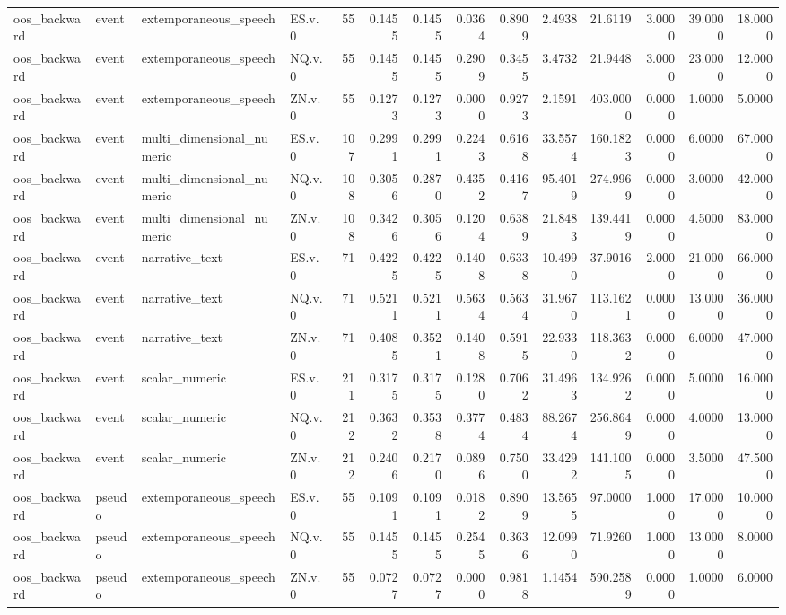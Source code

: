 \begin{tabular}{llllrrrrrrrrrr}
oos_backward & event & extemporaneous_speech & ES.v.0 & 55 & 0.1455 & 0.1455 & 0.0364 & 0.8909 & 2.4938 & 21.6119 & 3.0000 & 39.0000 & 18.0000 \\
oos_backward & event & extemporaneous_speech & NQ.v.0 & 55 & 0.1455 & 0.1455 & 0.2909 & 0.3455 & 3.4732 & 21.9448 & 3.0000 & 23.0000 & 12.0000 \\
oos_backward & event & extemporaneous_speech & ZN.v.0 & 55 & 0.1273 & 0.1273 & 0.0000 & 0.9273 & 2.1591 & 403.0000 & 0.0000 & 1.0000 & 5.0000 \\
oos_backward & event & multi_dimensional_numeric & ES.v.0 & 107 & 0.2991 & 0.2991 & 0.2243 & 0.6168 & 33.5574 & 160.1823 & 0.0000 & 6.0000 & 67.0000 \\
oos_backward & event & multi_dimensional_numeric & NQ.v.0 & 108 & 0.3056 & 0.2870 & 0.4352 & 0.4167 & 95.4019 & 274.9969 & 0.0000 & 3.0000 & 42.0000 \\
oos_backward & event & multi_dimensional_numeric & ZN.v.0 & 108 & 0.3426 & 0.3056 & 0.1204 & 0.6389 & 21.8483 & 139.4419 & 0.0000 & 4.5000 & 83.0000 \\
oos_backward & event & narrative_text & ES.v.0 & 71 & 0.4225 & 0.4225 & 0.1408 & 0.6338 & 10.4990 & 37.9016 & 2.0000 & 21.0000 & 66.0000 \\
oos_backward & event & narrative_text & NQ.v.0 & 71 & 0.5211 & 0.5211 & 0.5634 & 0.5634 & 31.9670 & 113.1621 & 0.0000 & 13.0000 & 36.0000 \\
oos_backward & event & narrative_text & ZN.v.0 & 71 & 0.4085 & 0.3521 & 0.1408 & 0.5915 & 22.9330 & 118.3632 & 0.0000 & 6.0000 & 47.0000 \\
oos_backward & event & scalar_numeric & ES.v.0 & 211 & 0.3175 & 0.3175 & 0.1280 & 0.7062 & 31.4963 & 134.9262 & 0.0000 & 5.0000 & 16.0000 \\
oos_backward & event & scalar_numeric & NQ.v.0 & 212 & 0.3632 & 0.3538 & 0.3774 & 0.4834 & 88.2674 & 256.8649 & 0.0000 & 4.0000 & 13.0000 \\
oos_backward & event & scalar_numeric & ZN.v.0 & 212 & 0.2406 & 0.2170 & 0.0896 & 0.7500 & 33.4292 & 141.1005 & 0.0000 & 3.5000 & 47.5000 \\
oos_backward & pseudo & extemporaneous_speech & ES.v.0 & 55 & 0.1091 & 0.1091 & 0.0182 & 0.8909 & 13.5655 & 97.0000 & 1.0000 & 17.0000 & 10.0000 \\
oos_backward & pseudo & extemporaneous_speech & NQ.v.0 & 55 & 0.1455 & 0.1455 & 0.2545 & 0.3636 & 12.0990 & 71.9260 & 1.0000 & 13.0000 & 8.0000 \\
oos_backward & pseudo & extemporaneous_speech & ZN.v.0 & 55 & 0.0727 & 0.0727 & 0.0000 & 0.9818 & 1.1454 & 590.2589 & 0.0000 & 1.0000 & 6.0000 \\

\end{tabular}
